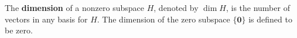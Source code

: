 \documentclass[10pt,letterpaper,final]{report}
\begin{document}
\begin{tcolorbox}[colback=blue!10!white, colframe=blue!10!black, title=Definition - Dimension of a Subspace]
  The \textbf{dimension} of a nonzero subspace $H$, denoted by $\dim H$, is the number of vectors in any basis for $H$. The dimension of the zero subspace $\{\mathbf{0}\}$ is defined to be zero.
\end{tcolorbox}
\end{document}
